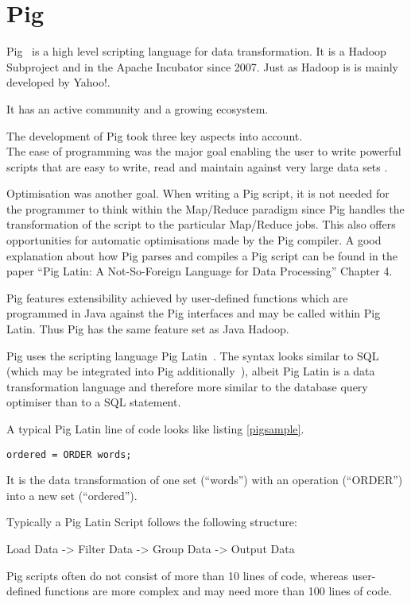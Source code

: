 \section{Pig}

Pig~\cite{pigWebsite}  is a high level scripting language for data transformation. It is a Hadoop Subproject and in the Apache Incubator since 2007. Just as Hadoop is is mainly developed by Yahoo!. 

It has an active community and a growing ecosystem.

The development of Pig took three key aspects into account. \\
The ease of programming was the major goal enabling the user to write powerful scripts that are easy to write, read and maintain against very large data sets .~\cite{pigWebsite}

Optimisation was another goal. When writing a Pig script, it is not needed for the programmer to think within the Map/Reduce paradigm since Pig handles the transformation of the script to the particular Map/Reduce jobs. This also offers opportunities for automatic optimisations made by the Pig compiler. A good explanation about how Pig parses and compiles a Pig script can be found in the paper ``Pig Latin: A Not-So-Foreign Language for Data Processing'' Chapter 4.~\cite{pigNotForeign}

Pig features extensibility achieved by user-defined functions which are programmed in Java against the Pig interfaces and may be called within Pig Latin. Thus Pig has the same feature set as Java Hadoop.

Pig uses the scripting language Pig Latin~\cite{pigManual}. The syntax looks similar to SQL (which may be integrated into Pig additionally~\cite{pigSql}), albeit Pig Latin is a data transformation language and therefore more similar to the database query optimiser than to a SQL statement.

A typical Pig Latin line of code looks like listing \ref{pigsample}.

\begin{lstlisting}[language=pig,caption=A typical Pig line of code,label=pigsample]
ordered = ORDER words;
\end{lstlisting}

It is the data transformation of one set (``words'') with an operation (``ORDER'') into a new set (``ordered'').

Typically a Pig Latin Script follows the following structure:

Load Data -> Filter Data -> Group Data -> Output Data

Pig scripts often do not consist of more than 10 lines of code, whereas user-defined functions are more complex and may need more than 100 lines of code.
                                                                                                               